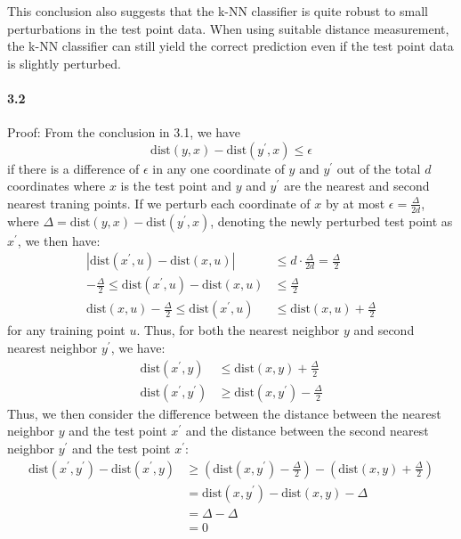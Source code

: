 \documentclass[11pt]{article}
\begin{document}
This conclusion also suggests that the k-NN classifier is quite robust to small perturbations in the test point data.
When using suitable distance measurement, the k-NN classifier can still yield the correct prediction even if the test point data is slightly perturbed.

\paragraph{3.2}
Proof:
\newline
From the conclusion in 3.1, we have
\begin{equation}
  \text{dist}(y, x) - \text{dist}(y^\prime, x) \leq \epsilon
\end{equation}
if there is a difference of $\epsilon$ in any one coordinate of $y$ and $y^\prime$ out of the total $d$ coordinates where $x$ is the test point and $y$ and $y^\prime$ are the nearest and second nearest traning points.
If we perturb each coordinate of $x$ by at most $\epsilon = \frac{\Delta}{2d}$, where $\Delta = \text{dist}(y, x) - \text{dist}(y^\prime, x)$, denoting the newly perturbed test point as $x^\prime$, we then have:
\begin{equation}
  \begin{split}
    |\text{dist}(x^\prime, u) - \text{dist}(x, u)| &\leq d\cdot\frac{\Delta}{2d} = \frac{\Delta}{2} \\
    -\frac{\Delta}{2} \leq \text{dist}(x^\prime, u) - \text{dist}(x, u) &\leq \frac{\Delta}{2} \\
    \text{dist}(x, u) - \frac{\Delta}{2} \leq \text{dist}(x^\prime, u) &\leq \text{dist}(x, u) + \frac{\Delta}{2}
  \end{split}
\end{equation}
for any training point $u$. Thus, for both the nearest neighbor $y$ and second nearest neighbor $y^\prime$, we have:
\begin{equation}
  \begin{split}
    \text{dist}(x^\prime, y) &\leq \text{dist}(x, y) + \frac{\Delta}{2} \\
    \text{dist}(x^\prime, y^\prime) &\geq \text{dist}(x, y^\prime) - \frac{\Delta}{2}
  \end{split}
\end{equation}
Thus, we then consider the difference between the distance between the nearest neighbor $y$ and the test point $x^\prime$ and the distance between the second nearest neighbor $y^\prime$ and the test point $x^\prime$:
\begin{equation}
  \begin{split}
    \text{dist}(x^\prime, y^\prime) - \text{dist}(x^\prime, y) &\geq (\text{dist}(x, y^\prime) - \frac{\Delta}{2}) - (\text{dist}(x, y) + \frac{\Delta}{2}) \\
    &= \text{dist}(x, y^\prime) - \text{dist}(x, y) - \Delta \\
    &= \Delta - \Delta \\
    &= 0
  \end{split}
\end{equation}
\end{document}
